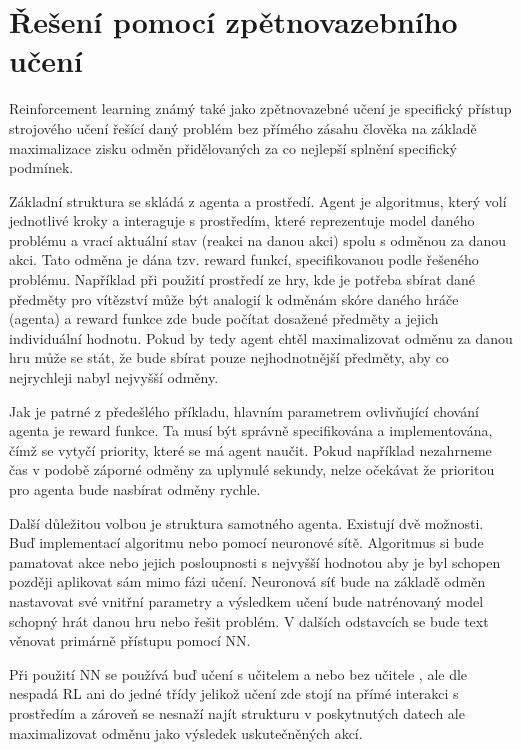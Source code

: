 \documentclass[czech, bc, kky, he, iso690numb]{fasthesis}
\begin{document}
        \section{Řešení pomocí zpětnovazebního učení}
            Reinforcement learning známý také jako zpětnovazebné učení je specifický přístup strojového učení řešící daný problém bez přímého zásahu člověka na základě maximalizace zisku odměn přidělovaných za co nejlepší splnění specifický podmínek.
            
            Základní struktura se skládá z agenta a prostředí. Agent je algoritmus, který volí jednotlivé kroky a interaguje s prostředím, které reprezentuje model daného problému a vrací aktuální stav (reakci na danou akci) spolu s odměnou za danou akci. Tato odměna je dána tzv. reward funkcí, specifikovanou podle řešeného problému. Například při použití prostředí ze hry, kde je potřeba sbírat dané předměty pro vítězství může být analogií k odměnám skóre daného hráče (agenta) a reward funkce zde bude počítat dosažené předměty a jejich individuální hodnotu. Pokud by tedy agent chtěl maximalizovat odměnu za danou hru může se stát, že bude sbírat pouze nejhodnotnější předměty, aby co nejrychleji nabyl nejvyšší odměny.
            
            Jak je patrné z předešlého příkladu, hlavním parametrem ovlivňující chování agenta je reward funkce. Ta musí být správně specifikována a implementována, čímž se vytyčí priority, které se má agent naučit. Pokud například nezahrneme čas v podobě záporné odměny za uplynulé sekundy, nelze očekávat že prioritou pro agenta bude nasbírat odměny rychle.
            
            Další důležitou volbou je struktura samotného agenta. Existují dvě možnosti. Buď implementací algoritmu nebo pomocí neuronové sítě. Algoritmus si bude pamatovat akce nebo jejich posloupnosti s nejvyšší hodnotou aby je byl schopen později aplikovat sám mimo fázi učení. Neuronová síť bude na základě odměn nastavovat své vnitřní parametry a výsledkem učení bude natrénovaný model schopný hrát danou hru nebo řešit problém. V dalších odstavcích se bude text věnovat primárně přístupu pomocí NN.
            
            Při použití NN se používá buď učení s učitelem a nebo bez učitele , ale dle \cite[p.~2]{RLbook} nespadá RL ani do jedné třídy jelikož učení zde stojí na přímé interakci s prostředím a zároveň se nesnaží najít strukturu v poskytnutých datech ale maximalizovat odměnu jako výsledek uskutečněných akcí.
            
\end{document}
